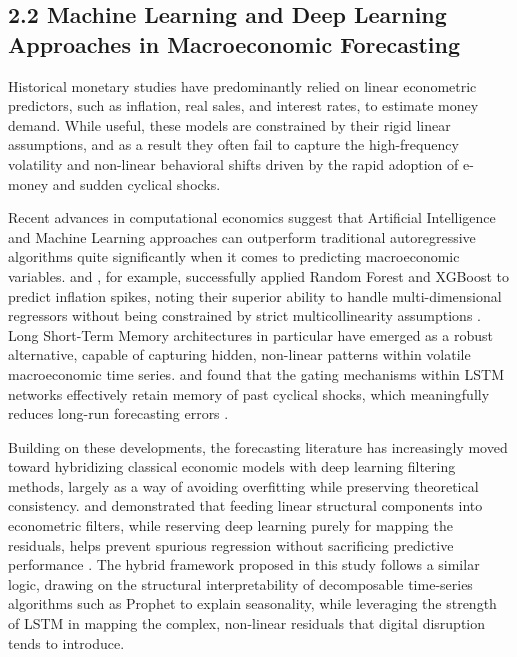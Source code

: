 \documentclass[12pt, letterpaper]{article}
\begin{document}
\subsection*{2.2 Machine Learning and Deep Learning Approaches in Macroeconomic Forecasting}
Historical monetary studies have predominantly relied on linear econometric predictors, such as inflation, real sales, and interest rates, to estimate money demand. While useful, these models are constrained by their rigid linear assumptions, and as a result they often fail to capture the high-frequency volatility and non-linear behavioral shifts driven by the rapid adoption of e-money and sudden cyclical shocks.

Recent advances in computational economics suggest that Artificial Intelligence and Machine Learning approaches can outperform traditional autoregressive algorithms quite significantly when it comes to predicting macroeconomic variables. \citet{Hopp2024} and \citet{Vancsura2025}, for example, successfully applied Random Forest and XGBoost to predict inflation spikes, noting their superior ability to handle multi-dimensional regressors without being constrained by strict multicollinearity assumptions \citep{Sikhwal2024, Zabraoui2026, Oancea2026, Alaminos2022}. Long Short-Term Memory architectures in particular have emerged as a robust alternative, capable of capturing hidden, non-linear patterns within volatile macroeconomic time series. \citet{Almosova2023} and \citet{Zhang2023} found that the gating mechanisms within LSTM networks effectively retain memory of past cyclical shocks, which meaningfully reduces long-run forecasting errors \citep{Rygh2025, Zhou2026, Tan2026, Gulia2025, MartinezCasares2026}.

Building on these developments, the forecasting literature has increasingly moved toward hybridizing classical economic models with deep learning filtering methods, largely as a way of avoiding overfitting while preserving theoretical consistency. \citet{Xiao2025} and \citet{Liu2024} demonstrated that feeding linear structural components into econometric filters, while reserving deep learning purely for mapping the residuals, helps prevent spurious regression without sacrificing predictive performance \citep{Rudd2026, Yamsani2025, Li2025}. The hybrid framework proposed in this study follows a similar logic, drawing on the structural interpretability of decomposable time-series algorithms such as Prophet to explain seasonality, while leveraging the strength of LSTM in mapping the complex, non-linear residuals that digital disruption tends to introduce.
\end{document}

